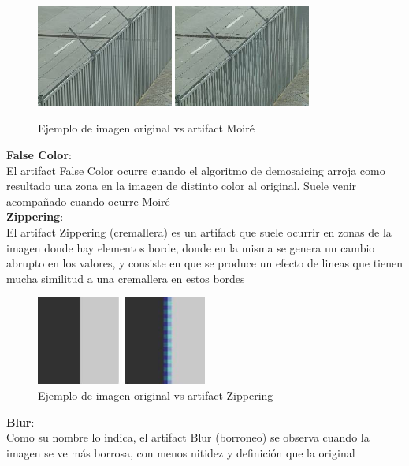 \begin{figure}[htb]
\begin{center}
       \includegraphics[width=0.4\textwidth]{imagenes/moire_original.jpg}
          \hfill
           \includegraphics[width=0.4\textwidth]{imagenes/moire_example.jpg}
          
       Ejemplo de imagen original vs artifact Moiré
       \end{center}

\end{figure}

\textbf{False Color}:\\
El artifact False Color ocurre cuando el algoritmo de demosaicing arroja como resultado una zona en la imagen de distinto color al original. Suele venir acompañado cuando ocurre Moiré
\\
\textbf{Zippering}:\\
El artifact Zippering (cremallera) es un artifact que suele ocurrir en zonas de la imagen donde hay elementos borde, donde en la misma se genera un cambio abrupto en los valores, y consiste en que se produce un efecto de lineas que tienen mucha similitud a una cremallera en estos bordes
\\
\begin{figure}[htb]
\begin{center}
       \includegraphics[width=0.5\textwidth]{imagenes/zippering_example.jpeg}
       \caption{Ejemplo de imagen original vs artifact Zippering}
       \end{center}

\end{figure}
\textbf{Blur}:\\
Como su nombre lo indica, el artifact Blur (borroneo) se observa cuando la imagen se ve más borrosa, con menos nitidez y definición que la original\\

